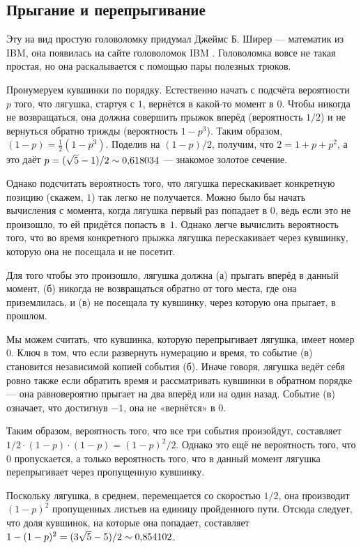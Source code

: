 \subsection*{Прыгание и перепрыгивание}

Эту на вид простую головоломку придумал Джеймс Б. Ширер --- математик из IBM,
она появилась на сайте головоломок IBM \cite[апрель 2007]{ponder-this}.
Головоломка вовсе не такая простая, но она раскалывается с помощью пары полезных трюков.

Пронумеруем кувшинки по порядку.
Естественно начать с подсчёта вероятности $p$ того, что лягушка, стартуя с $1$, вернётся в какой-то момент в $0$.
Чтобы никогда не возвращаться, она должна совершить прыжок вперёд (вероятность $1/2$) и не вернуться обратно трижды (вероятность $1 - p^3$).
Таким образом, $(1 - p) = \tfrac12(1 - p^3)$.
Поделив на $(1 - p)/2$, получим, что $2 = 1 + p + p^2$, а это даёт $p = (\sqrt5 - 1)/2 \z\sim 0{,}618034$ --- знакомое золотое сечение.

Однако подсчитать вероятность того, что лягушка перескакивает конкретную позицию (скажем, $1$) так легко не получается.
Можно было бы начать вычисления с момента, когда лягушка первый раз попадает в $0$, ведь если это не произошло, то ей придётся попасть в~$1$.
Однако легче вычислить вероятность того, что во время конкретного прыжка лягушка перескакивает через кувшинку, которую она  не посещала и не посетит.

Для того чтобы это произошло, лягушка должна
(а) прыгать вперёд в данный момент,
(б) никогда не возвращаться обратно от того места, где она приземлилась,
и (в) не посещала ту кувшинку, через которую она прыгает, в прошлом.

Мы можем считать, что кувшинка, которую перепрыгивает лягушка, имеет номер 0.
Ключ в том, что если развернуть нумерацию и время, то событие (в) становится независимой копией события (б).
Иначе говоря, лягушка ведёт себя ровно также если обратить время и рассматривать кувшинки в обратном порядке ---
она равновероятно прыгает на два вперёд или на один назад.
Событие (в) означает, что достигнув $-1$, она не «вернётся» в $0$.

Таким образом, вероятность того, что все три события произойдут, составляет $1/2 \cdot (1 - p) \cdot (1 - p) = (1 - p)^2 / 2$.
Однако это ещё не вероятность того, что $0$ пропускается, а только вероятность того, что в данный момент лягушка перепрыгивает через пропущенную кувшинку.

Поскольку лягушка, в среднем, перемещается со скоростью $1/2$, она производит $(1 - p)^2$ пропущенных листьев на единицу пройденного пути.
Отсюда следует, что доля кувшинок, на которые она попадает, составляет $1 - (1 - p)^2 \z= (3\sqrt5 - 5) / 2 \sim 0{,}854102$.

